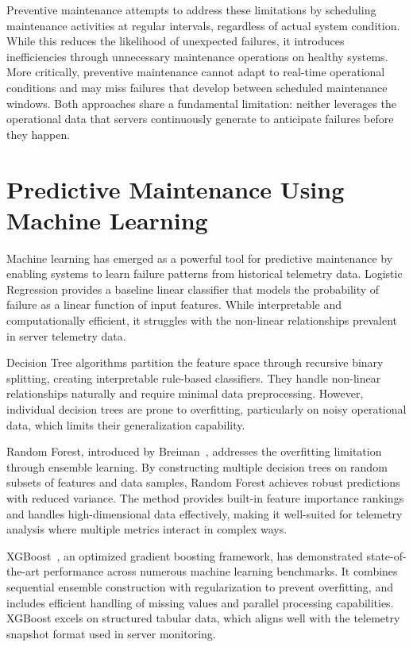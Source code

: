 \documentclass[12pt,letterpaper]{report}
\begin{document}
Preventive maintenance attempts to address these limitations by scheduling maintenance activities at regular intervals, regardless of actual system condition. While this reduces the likelihood of unexpected failures, it introduces inefficiencies through unnecessary maintenance operations on healthy systems. More critically, preventive maintenance cannot adapt to real-time operational conditions and may miss failures that develop between scheduled maintenance windows. Both approaches share a fundamental limitation: neither leverages the operational data that servers continuously generate to anticipate failures before they happen.

\section{Predictive Maintenance Using Machine Learning}

Machine learning has emerged as a powerful tool for predictive maintenance by enabling systems to learn failure patterns from historical telemetry data. Logistic Regression provides a baseline linear classifier that models the probability of failure as a linear function of input features. While interpretable and computationally efficient, it struggles with the non-linear relationships prevalent in server telemetry data.

Decision Tree algorithms partition the feature space through recursive binary splitting, creating interpretable rule-based classifiers. They handle non-linear relationships naturally and require minimal data preprocessing. However, individual decision trees are prone to overfitting, particularly on noisy operational data, which limits their generalization capability.

Random Forest, introduced by Breiman~\cite{breiman2001}, addresses the overfitting limitation through ensemble learning. By constructing multiple decision trees on random subsets of features and data samples, Random Forest achieves robust predictions with reduced variance. The method provides built-in feature importance rankings and handles high-dimensional data effectively, making it well-suited for telemetry analysis where multiple metrics interact in complex ways.

XGBoost~\cite{chen2016}, an optimized gradient boosting framework, has demonstrated state-of-the-art performance across numerous machine learning benchmarks. It combines sequential ensemble construction with regularization to prevent overfitting, and includes efficient handling of missing values and parallel processing capabilities. XGBoost excels on structured tabular data, which aligns well with the telemetry snapshot format used in server monitoring.
\end{document}

